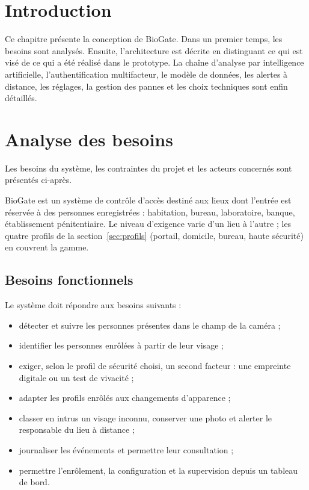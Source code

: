 \section*{Introduction}

Ce chapitre présente la conception de BioGate. Dans un premier temps, les besoins sont analysés. Ensuite, l'architecture est décrite en distinguant ce qui est visé de ce qui a été réalisé dans le prototype. La chaîne d'analyse par intelligence artificielle, l'authentification multifacteur, le modèle de données, les alertes à distance, les réglages, la gestion des pannes et les choix techniques sont enfin détaillés.

\section{Analyse des besoins}

Les besoins du système, les contraintes du projet et les acteurs concernés sont présentés ci-après.

\begin{maj}
BioGate est un système de contrôle d'accès destiné aux lieux dont l'entrée est réservée à des personnes enregistrées : habitation, bureau, laboratoire, banque, établissement pénitentiaire. Le niveau d'exigence varie d'un lieu à l'autre ; les quatre profils de la section~\ref{sec:profils} (portail, domicile, bureau, haute sécurité) en couvrent la gamme.
\end{maj}

\subsection{Besoins fonctionnels}

Le système doit répondre aux besoins suivants :
\begin{itemize}
  \item détecter et suivre les personnes présentes dans le champ de la caméra ;
  \item identifier les personnes enrôlées à partir de leur visage ;
  \item exiger, selon le profil de sécurité choisi, un second facteur : une empreinte digitale ou un test de vivacité ;
  \item adapter les profils enrôlés aux changements d'apparence ;
  \item classer en intrus un visage inconnu, conserver une photo et alerter le responsable du lieu à distance ;
  \item journaliser les événements et permettre leur consultation ;
  \item permettre l'enrôlement, la configuration et la supervision depuis un tableau de bord.
\end{itemize}

